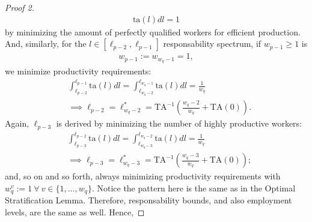 \documentclass[hidelinks, nonatbib]{elsarticle}
\begin{document}
\begin{lemma}
\begin{proof}[Proof 2]
\begin{align}
{                \text{ta}(l)
                dl
            }
            =
            1
        \end{align}
        by minimizing the amount of perfectly qualified workers for efficient production. And, similarly, for the $
        l \in [
            \ell_{p - 2},
            \ell_{p - 1}
        ]
        $ responsability spectrum, if $w_{p-1} \geq 1$ is
        \begin{gather}
        w_{p-1} := w_{w_q - 1} = 1
        ,
        \end{gather}
        we minimize productivity requirements:
        \begin{align}
            &
            \int_{
                \ell_{p-2}
            }^{
                \ell_{p-1}
            }{
                \text{ta}(l)dl
            }
            =
            \int_{
                \ell_{w_q-2}
            }^{
                \ell_{w_q-1}
            }{
                \text{ta}(l)dl
            }
            =
            \frac{1}{w_q}
            \\
            &
            \implies
            \ell_{p-2}
            =
            \ell_{w_q-2}^{*}
            =
            \text{TA}^{-1}\left(
                \frac{w_q - 2}{w_q}
                +
                \text{TA}(0)
            \right)
            .
        \end{align}
        Again, $\ell_{p - 3}$ is derived by minimizing the number of highly productive workers:
        \begin{align}
            &
            \int_{
                \ell_{p-3}
            }^{
                \ell_{p-2}
            }{
                \text{ta}(l)dl
            }
            =
            \int_{
                \ell_{w_q-3}
            }^{
                \ell_{w_q-2}
            }{
                \text{ta}(l)dl
            }
            =
            \frac{1}{w_q}
            \\
            &
            \implies
            \ell_{p-3}
            =
            \ell_{w_q-3}^{*}
            =
            \text{TA}^{-1}\left(
                \frac{w_q - 3}{w_q}
                +
                \text{TA}(0)
            \right)
            ;
        \end{align}
        and, so on and so forth, always minimizing productivity requirements with $w_{q}^{v} := 1 \ \forall \ v \in \{1, \dots, w_q\}$. Notice the pattern here is the same as in the Optimal Stratification Lemma. Therefore, responsability bounds, and also employment levels, are the same as well. Hence,

\end{proof}
\end{lemma}
\end{document}
